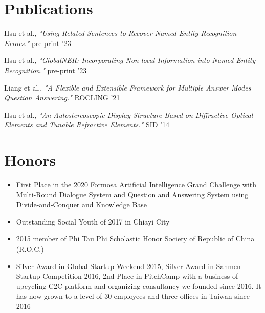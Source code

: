 \documentclass[letterpaper,11pt]{article}
\newcommand{\arabicListStart}{\begin{enumerate}[label={\textbf{[\arabic*]}}]}
\newcommand{\arabicListEnd}{\end{enumerate}\vspace{-5pt}}
\newcommand{\bulletedListStart}{\begin{itemize}[]}
\newcommand{\bulletedListEnd}{\end{itemize}\vspace{-5pt}}
\newcommand{\simpleItem}[1]{
  \item\small{
    {#1 \vspace{-9pt}}
  }
}
\begin{document}


\section{Publications}
    \arabicListStart
      \simpleItem
          {Hsu et al., \textit{"Using Related Sentences to Recover Named Entity Recognition Errors."} pre-print '23}\label{pub:recovery}
      \simpleItem
          {Hsu et al., \textit{"GlobalNER: Incorporating Non-local Information into Named Entity Recognition."} pre-print '23}\label{pub:globalner}
      \simpleItem
          {Liang et al., \textit{"A Flexible and Extensible Framework for Multiple Answer Modes Question Answering."} ROCLING '21}\label{pub:qa}
      \simpleItem
          {Hsu et al., \textit{"An Autostereoscopic Display Structure Based on Diffractive Optical Elements and Tunable Refractive Elements."} SID '14}\label{pub:sid}

    \arabicListEnd

\section{Honors}
    \bulletedListStart
      \simpleItem
        {First Place in the 2020 Formosa Artificial Intelligence Grand Challenge with Multi-Round Dialogue System and Question and Answering System using Divide-and-Conquer and Knowledge Base}
      \simpleItem
        {Outstanding Social Youth of 2017 in Chiayi City}
      \simpleItem
         {2015 member of Phi Tau Phi Scholastic Honor Society of Republic of China (R.O.C.)}
      \simpleItem
         {Silver Award in Global Startup Weekend 2015, Silver Award in Sanmen Startup Competition 2016, 2nd Place in PitchCamp with a business of upcycling C2C platform and organizing consultancy we founded since 2016. It has now grown to a level of 30 employees and three offices in Taiwan since 2016}
    \bulletedListEnd
    
\end{document}
